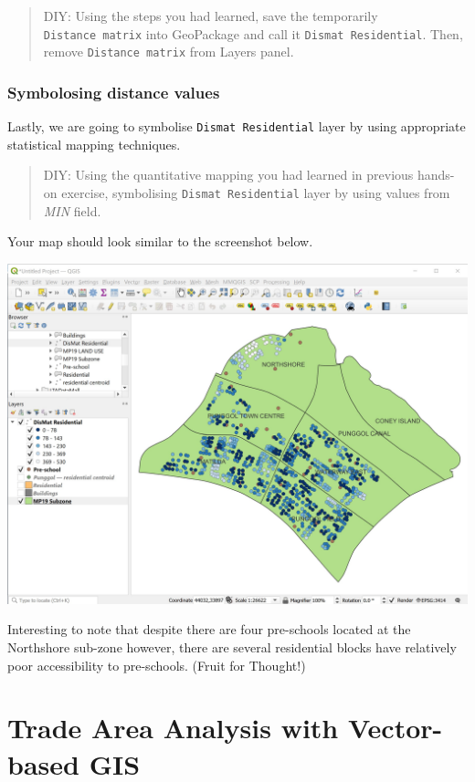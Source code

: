 \documentclass[
  letterpaper,
  DIV=11,
  numbers=noendperiod]{scrreprt}
\begin{document}
\begin{quote}
DIY: Using the steps you had learned, save the temporarily
\texttt{Distance\ matrix} into GeoPackage and call it
\texttt{Dismat\ Residential}. Then, remove \texttt{Distance\ matrix}
from Layers panel.
\end{quote}

\hypertarget{symbolosing-distance-values}{%
\subsection{Symbolosing distance
values}\label{symbolosing-distance-values}}

Lastly, we are going to symbolise \texttt{Dismat\ Residential} layer by
using appropriate statistical mapping techniques.

\begin{quote}
DIY: Using the quantitative mapping you had learned in previous hands-on
exercise, symbolising \texttt{Dismat\ Residential} layer by using values
from \emph{MIN} field.
\end{quote}

Your map should look similar to the screenshot below.

\includegraphics{./img04/image122.jpg}

Interesting to note that despite there are four pre-schools located at
the Northshore sub-zone however, there are several residential blocks
have relatively poor accessibility to pre-schools. (Fruit for Thought!)


\hypertarget{trade-area-analysis-with-vector-based-gis}{%
\chapter{Trade Area Analysis with Vector-based
GIS}\label{trade-area-analysis-with-vector-based-gis}}
\end{document}
